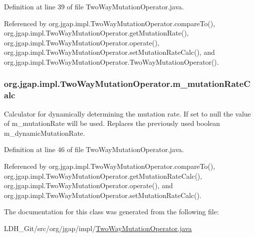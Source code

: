 Definition at line 39 of file Two\-Way\-Mutation\-Operator.\-java.



Referenced by org.\-jgap.\-impl.\-Two\-Way\-Mutation\-Operator.\-compare\-To(), org.\-jgap.\-impl.\-Two\-Way\-Mutation\-Operator.\-get\-Mutation\-Rate(), org.\-jgap.\-impl.\-Two\-Way\-Mutation\-Operator.\-operate(), org.\-jgap.\-impl.\-Two\-Way\-Mutation\-Operator.\-set\-Mutation\-Rate\-Calc(), and org.\-jgap.\-impl.\-Two\-Way\-Mutation\-Operator.\-Two\-Way\-Mutation\-Operator().

\hypertarget{classorg_1_1jgap_1_1impl_1_1_two_way_mutation_operator_aaf31fb0ac9dfd8b730fe260280ec34ef}{
\subsubsection[{m\-\_\-mutation\-Rate\-Calc}]{ org.\-jgap.\-impl.\-Two\-Way\-Mutation\-Operator.\-m\-\_\-mutation\-Rate\-Calc\hspace{0.3cm}{\ttfamily [private]}}}\label{classorg_1_1jgap_1_1impl_1_1_two_way_mutation_operator_aaf31fb0ac9dfd8b730fe260280ec34ef}
Calculator for dynamically determining the mutation rate. If set to null the value of m\-\_\-mutation\-Rate will be used. Replaces the previously used boolean m\-\_\-dynamic\-Mutation\-Rate. 

Definition at line 46 of file Two\-Way\-Mutation\-Operator.\-java.



Referenced by org.\-jgap.\-impl.\-Two\-Way\-Mutation\-Operator.\-compare\-To(), org.\-jgap.\-impl.\-Two\-Way\-Mutation\-Operator.\-get\-Mutation\-Rate\-Calc(), org.\-jgap.\-impl.\-Two\-Way\-Mutation\-Operator.\-operate(), and org.\-jgap.\-impl.\-Two\-Way\-Mutation\-Operator.\-set\-Mutation\-Rate\-Calc().



The documentation for this class was generated from the following file\-:\begin{DoxyCompactItemize}
\item 
L\-D\-H\-\_\-\-Git/src/org/jgap/impl/\hyperlink{_two_way_mutation_operator_8java}{Two\-Way\-Mutation\-Operator.\-java}\end{DoxyCompactItemize}
